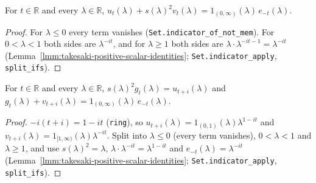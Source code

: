 \begin{lemma}
    \label{lmm:takesaki-functions-lower-sum}
    \leanok
    For $t \in \mathbb{R}$ and every $\lambda \in \mathbb{R}$, $u_t(\lambda) + s(\lambda)^2v_t(\lambda) = 1_{(0,\infty)}(\lambda)\,e_{-t}(\lambda)$.
\end{lemma}
\begin{proof}
    \leanok
    For $\lambda \le 0$ every term vanishes (\texttt{Set.indicator\_of\_not\_mem}). For $0 < \lambda < 1$ both sides are $\lambda^{-it}$, and for $\lambda \ge 1$ both sides are $\lambda \cdot \lambda^{-it-1} = \lambda^{-it}$ (Lemma~\ref{lmm:takesaki-positive-scalar-identities}; \texttt{Set.indicator\_apply}, \texttt{split\_ifs}).
\end{proof}

\begin{lemma}
    \label{lmm:takesaki-functions-upper-identities}
    \leanok
    For $t \in \mathbb{R}$ and every $\lambda \in \mathbb{R}$, $s(\lambda)^2g_t(\lambda) = u_{t+i}(\lambda)$ and $g_t(\lambda) + v_{t+i}(\lambda) = 1_{(0,\infty)}(\lambda)\,e_{-t}(\lambda)$.
\end{lemma}
\begin{proof}
    \leanok
    $-i(t + i) = 1 - it$ (\texttt{ring}), so $u_{t+i}(\lambda) = 1_{(0,1)}(\lambda)\lambda^{1-it}$ and $v_{t+i}(\lambda) = 1_{[1,\infty)}(\lambda)\lambda^{-it}$. Split into $\lambda \le 0$ (every term vanishes), $0 < \lambda < 1$ and $\lambda \ge 1$, and use $s(\lambda)^2 = \lambda$, $\lambda \cdot \lambda^{-it} = \lambda^{1-it}$ and $e_{-t}(\lambda) = \lambda^{-it}$ (Lemma~\ref{lmm:takesaki-positive-scalar-identities}; \texttt{Set.indicator\_apply}, \texttt{split\_ifs}).
\end{proof}

